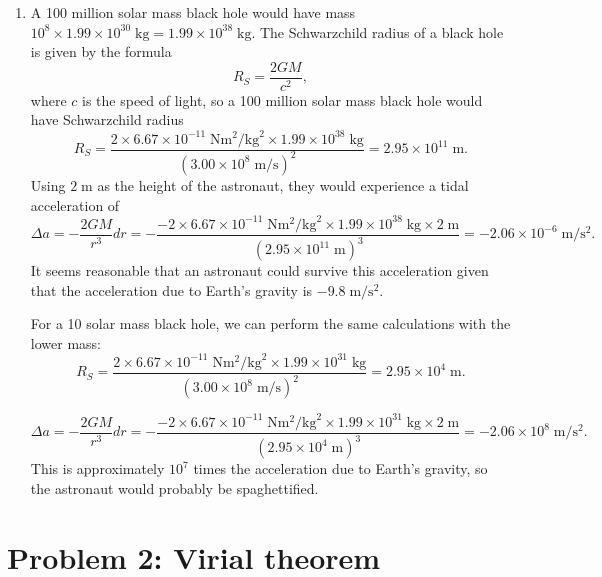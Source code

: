 \documentclass[11pt,letterpaper]{article}
\begin{document}
\begin{enumerate}[label=(\alph*)]
    \item
    A 100 million solar mass black hole would have mass $10^8\times 1.99\times 10^{30}\;\si{\kg} = 1.99\times 10^{38}\;\si{\kg}.$
    The Schwarzchild radius of a black hole is given by the formula $$R_S = \frac{2GM}{c^2},$$ where $c$ is the speed of light, so a 100 million solar mass black hole would have Schwarzchild radius $$R_S = \frac{2\times 6.67\times 10^{-11}\;\si{\newton\square\meter\per\square\kg}\times 1.99\times 10^{38}\;\si{\kg}}{(3.00\times 10^8\;\si{\meter\per\second})^2} = 2.95\times 10^{11}\;\si{\meter}.$$ Using $2\;\si{\meter}$ as the height of the astronaut, they would experience a tidal acceleration of $$\Delta a = -\frac{2GM}{r^3}dr = -\frac{-2\times 6.67\times 10^{-11}\;\si{\newton\square\meter\per\square\kg}\times 1.99\times 10^{38}\;\si{\kg}\times 2\;\si{\meter}}{(2.95\times 10^{11}\;\si{\meter})^3} = -2.06\times 10^{-6}\;\si{\meter\per\square\second}.$$ It seems reasonable that an astronaut could survive this acceleration given that the acceleration due to Earth's gravity is $-9.8\;\si{\meter\per\square\second}.$ 
    
    For a 10 solar mass black hole, we can perform the same calculations with the lower mass: $$R_S = \frac{2\times 6.67\times 10^{-11}\;\si{\newton\square\meter\per\square\kg}\times 1.99\times 10^{31}\;\si{\kg}}{(3.00\times 10^8\;\si{\meter\per\second})^2} = 2.95\times 10^{4}\;\si{\meter}.$$
    
    $$\Delta a = -\frac{2GM}{r^3}dr = -\frac{-2\times 6.67\times 10^{-11}\;\si{\newton\square\meter\per\square\kg}\times 1.99\times 10^{31}\;\si{\kg}\times 2\;\si{\meter}}{(2.95\times 10^4\;\si{\meter})^3} = -2.06\times 10^8\;\si{\meter\per\square\second}.$$ This is approximately $10^7$ times the acceleration due to Earth's gravity, so the astronaut would probably be spaghettified. 
    

\end{enumerate}

\section*{Problem 2: Virial theorem}
\end{document}

